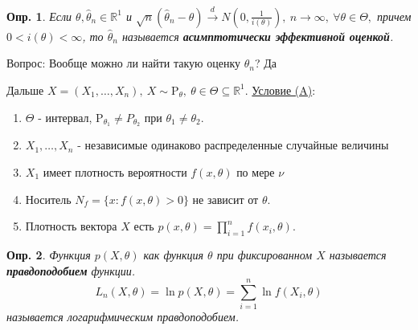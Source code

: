 \documentclass[12pt]{article}
\newtheorem{definition}{Опр.}
\theoremstyle{basic_theorem}
\theoremstyle{name_theorem}
\newcommand\defin[1]{\textbf{#1}}
\def\R{ \mathbb{R} }
\def\P{ \mathrm{P} }
\begin{document}
    \begin{definition}
        Если \(\theta, \widehat{\theta}_n \in \R^1\) и $\sqrt{n}(\widehat{\theta}_n - \theta)\xrightarrow{d} N(0, \frac{1}{i(\theta)}),
        \ n \rightarrow \infty, \ \forall \theta \in \Theta,$
        причем \(0 < i(\theta) < \infty\), то \(\widehat{\theta}_n\) называется \defin{асимптотически
        эффективной оценкой}.
    \end{definition}
    Вопрос: Вообще можно ли найти такую оценку \(\widehat{\theta}_n\)? Да

    \newpage

    Дальше \(X = (X_1, \ldots, X_n), \ X \sim \P_\theta,\ \theta \in \Theta \subseteq \R^1\).
    \underline{Условие (A)}:
    \begin{enumerate}
        \item \(\Theta\) - интервал, \(\P_{\theta_1} \neq P_{\theta_2}\) при \(\theta_1 \neq \theta_2\).
        \item \(X_1, \ldots, X_n\) - независимые одинаково распределенные случайные величины
        \item \(X_1\) имеет плотность вероятности \(f(x, \theta)\) по мере \(\nu\)
        \item Носитель \(N_f = \{x: f(x, \theta) > 0\}\) не зависит от \(\theta\).
        \item Плотность вектора \(X\) есть \(p(x, \theta) = \prod_{i=1}^n f(x_i, \theta)\).
    \end{enumerate}
    \begin{definition}
    Функция \(p(X, \theta)\) как функция \(\theta\) при фиксированном \(X\) называется
    \defin{правдоподобием} функции.
    \[L_n(X, \theta) = \ln p(X, \theta) = \sum_{i=1}^n \ln f(X_i, \theta)\]
    называется логарифмическим правдоподобием.
    \end{definition}
\end{document}
